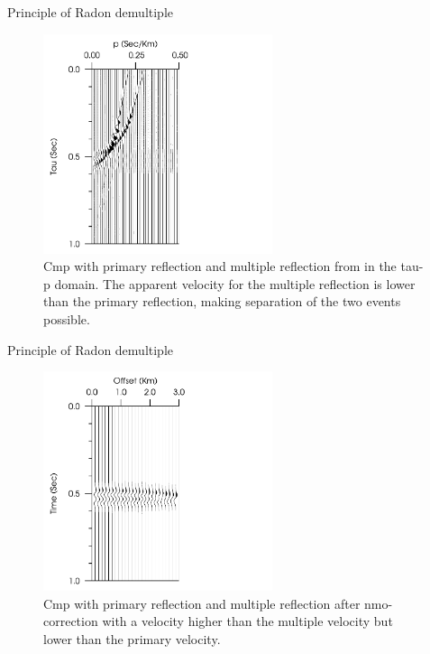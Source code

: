\documentclass[xcolor=dvipsnames,notes]{beamer}
\begin{document}
%
\begin{frame}{Principle of Radon demultiple}
%
\begin{figure}
\includegraphics[width=0.6\textwidth]{Fig/fig-6-taup.pdf}
\caption{Cmp with primary reflection and multiple reflection from \protect{\ref{fig-6-cdp}} in the tau-p domain.
         The apparent velocity for the multiple reflection is lower than the primary reflection, 
         making separation of the two events possible.}
\end{figure}
%
\end{frame}
%
\begin{frame}{Principle of Radon demultiple}
\begin{figure}
\includegraphics[width=0.6\textwidth]{Fig/fig-6-nmo.pdf}
\caption{Cmp with primary reflection and multiple reflection after nmo-correction
         with a velocity higher than the multiple velocity but lower than the primary velocity.}
 \label{fig-6-nmo}
\end{figure}
\end{frame}
\end{document}
